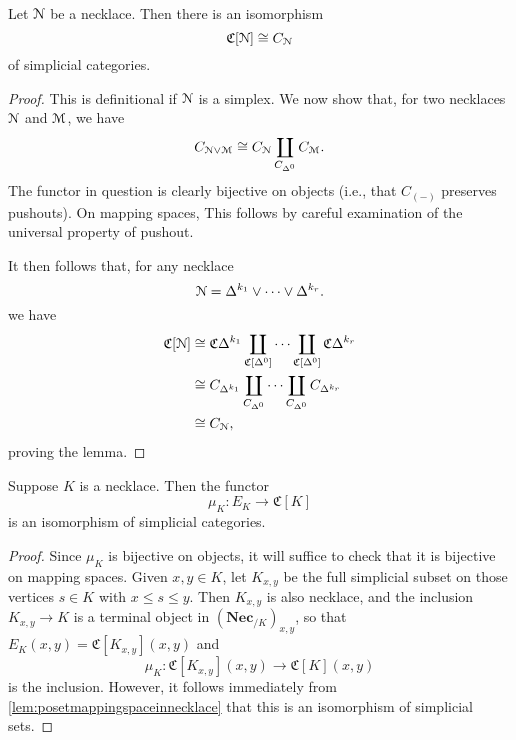 \begin{lemma}\label{lem:posetmappingspaceinnecklace}
	Let $\EuScript{N}$ be a necklace. Then there is an isomorphism
	\[
	\mathfrak{C}[\EuScript{N}]\cong C_{\EuScript{N}}
	\]
	of simplicial categories.
\end{lemma}

\begin{proof}
	This is definitional if $\EuScript{N}$ is a simplex. We now show that, for two necklaces $\EuScript{N}$ and $\EuScript{M}$, we have 
	\[
	C_{\EuScript{N}\vee \EuScript{M}}\cong C_{\EuScript{N}}\coprod_{C_{\Delta^0}} C_{\EuScript{M}}. 
	\] 
	The functor in question is clearly bijective on objects (i.e., that $C_{(-)}$ preserves pushouts). On mapping spaces, This follows by careful examination of the universal property of pushout.  
	
	It then follows that, for any necklace
	\[
	\EuScript{N}= \Delta^{k_1}\vee \cdots \vee \Delta^{k_r}. 
	\] 
	we have 
	\begin{align*}
	\mathfrak{C}[\EuScript{N}] & \cong \mathfrak{C}{\Delta^{k_1}}\coprod_{\mathfrak{C}[\Delta^0]} \cdots \coprod_{\mathfrak{C}[\Delta^0]} \mathfrak{C}{\Delta^{k_r}}\\
	& \cong C_{\Delta^{k_1}}\coprod_{C_{\Delta^0}} \cdots \coprod_{C_{\Delta^0}} C_{\Delta^{k_r}}\\
	& \cong C_{\EuScript{N}},
	\end{align*}
	proving the lemma. 
\end{proof}

\begin{corollary}\label{cor:mappingspaceinnecklacecolim}
	Suppose $K$ is a necklace. Then the functor 
	\[
	\mu_K: E_K\to \mathfrak{C}[K] 
	\]
	is an isomorphism of simplicial categories.
\end{corollary}
\begin{proof}
	Since $\mu_K$ is bijective on objects, it will suffice to check that it is bijective on mapping spaces. Given $x,y\in K$, let $K_{x,y}$ be the full simplicial subset on those vertices $s\in K$ with $x\leq s\leq y$. Then $K_{x,y}$ is also necklace, and the inclusion $K_{x,y}\to K$ is a terminal object in $(\mathbf{Nec}_{/K})_{x,y}$, so that $E_K(x,y)=\mathfrak{C}[K_{x,y}](x,y)$ and 
	\[
	\mu_K: \mathfrak{C}[K_{x,y}](x,y)\to \mathfrak{C}[K](x,y)
	\]  
	is the inclusion. However, it follows immediately from \autoref{lem:posetmappingspaceinnecklace} that this is an isomorphism of simplicial sets.
\end{proof}

